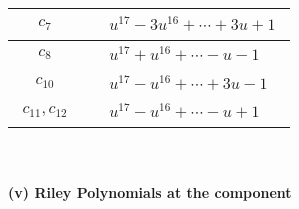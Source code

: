 \documentclass[1p]{elsarticle_modified}
\theoremstyle{definition}
\begin{document}
\begin{tabular}{m{50pt}|m{274pt}}
\hline $$\begin{aligned}c_{7}\end{aligned}$$&$\begin{aligned}
&u^{17}-3 u^{16}+\cdots+3 u+1
\end{aligned}$\\
\hline $$\begin{aligned}c_{8}\end{aligned}$$&$\begin{aligned}
&u^{17}+u^{16}+\cdots- u-1
\end{aligned}$\\
\hline $$\begin{aligned}c_{10}\end{aligned}$$&$\begin{aligned}
&u^{17}- u^{16}+\cdots+3 u-1
\end{aligned}$\\
\hline $$\begin{aligned}c_{11},c_{12}\end{aligned}$$&$\begin{aligned}
&u^{17}- u^{16}+\cdots- u+1
\end{aligned}$\\
\hline
\end{tabular}\\~\\
\newpage\renewcommand{\arraystretch}{1}
\flushleft \textbf{(v) Riley Polynomials at the component}\newline \\
\end{document}
